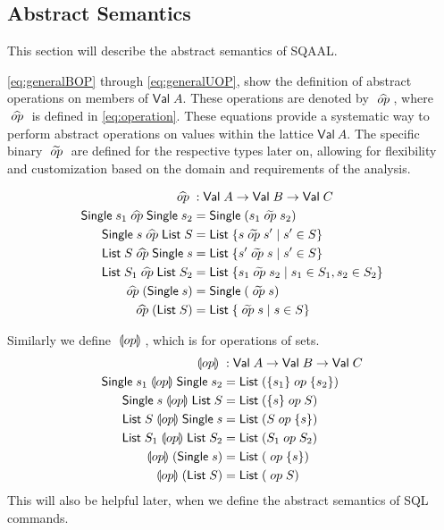
\subsection{Abstract Semantics}\label{subsec:abstract-semantics}
This section will describe the abstract semantics of SQAAL.

\autoref{eq:generalBOP} through \ref{eq:generalUOP}, show the definition of abstract operations on members of $\mathsf{Val} \; A$.
These operations are denoted by $\;\widehat{op}\;$, where $\;\widehat{op}\;$ is defined in \autoref{eq:operation}.
These equations provide a systematic way to perform abstract operations on values within the lattice $\mathsf{Val} \ A$.
The specific binary $\;\widetilde{op}\;$ are defined for the respective types later on, allowing for flexibility and customization based on the domain and requirements of the analysis.

\begin{align}
    \aop &: \mathsf{Val} \; A \rightarrow \mathsf{Val} \; B \rightarrow \mathsf{Val} \; C \label{eq:operation} \\
    \mathsf{Single} \; s_1 \aop \mathsf{Single} \; s_2 &= \mathsf{Single} \; (s_1 \aaop s_2) \label{eq:generalBOP} \\
    \mathsf{Single} \; s \aop \mathsf{List} \; S &= \mathsf{List} \; \{ s \aaop s' \mid s' \in S \} \\
    \mathsf{List} \; S \aop \mathsf{Single} \; s &= \mathsf{List} \; \{ s' \aaop s \mid s' \in S \}  \\
    \mathsf{List} \; S_1 \aop \mathsf{List} \; S_2 &= \mathsf{List} \; \{ s_1 \aaop s_2 \mid s_1 \in S_1, s_2 \in S_2 \} \\
    \aop (\mathsf{Single} \; s) &= \mathsf{Single} \; (\aaop s) \\
    \aop (\mathsf{List} \; S) &= \mathsf{List} \; \{ \aaop s \mid s \in S \} \label{eq:generalUOP}
\end{align}

Similarly we define $\;\llparenthesis op\rrparenthesis\;$, which is for operations of sets.
\begin{align}
    \;\llparenthesis op\rrparenthesis\; &: \mathsf{Val} \; A \rightarrow \mathsf{Val} \; B \rightarrow \mathsf{Val} \; C \\
    \mathsf{Single} \; s_1 \;\llparenthesis op\rrparenthesis\; \mathsf{Single} \; s_2 &= \mathsf{List} \; (\{s_1\} \;op\; \{s_2\}) \\
    \mathsf{Single} \; s \;\llparenthesis op\rrparenthesis\; \mathsf{List} \; S &= \mathsf{List} \; (\{ s \} \;op\; S) \\
    \mathsf{List} \; S \;\llparenthesis op\rrparenthesis\; \mathsf{Single} \; s &= \mathsf{List} \; (S \;op\; \{ s \})  \\
    \mathsf{List} \; S_1 \;\llparenthesis op\rrparenthesis\; \mathsf{List} \; S_2 &= \mathsf{List} \; (S_1 \;op\; S_2) \\
    \;\llparenthesis op\rrparenthesis\; (\mathsf{Single} \; s) &= \mathsf{List} \; (\;op\; \{ s \}) \\
    \;\llparenthesis op\rrparenthesis\; (\mathsf{List} \; S) &= \mathsf{List} \; (\;op\; S )
\end{align}
This will also be helpful later, when we define the abstract semantics of SQL commands.

